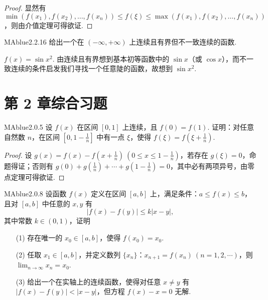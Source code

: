 \begin{proof}
    显然有 $\min\left( f(x_1), f(x_2), \ldots, f(x_n) \right) \leqslant f(\xi) \leqslant \max\left( f(x_1), f(x_2), \ldots, f(x_n) \right)$，则由介值定理可得欲证.
\end{proof}

\begin{problem}{MAblue}{2.2.16}
    给出一个在 $(-\infty, +\infty)$ 上连续且有界但不一致连续的函数.
\end{problem}

\begin{solution}
    $f(x) = \sin x^2$. 由连续且有界想到基本初等函数中的 $\sin x$（或 $\cos x$），而不一致连续的条件启发我们寻找一个任意陡的函数，故想到 $\sin x^2$.
\end{solution}

\section*{第 2 章综合习题}

\begin{problem}{MAblue}{2.0.5}
    设 $f(x)$ 在区间 $[0, 1]$ 上连续，且 $f(0) = f(1)$. 证明：对任意自然数 $n$，在区间 $\left[ 0, 1 - \frac 1 n \right]$ 中有一点 $\xi$，使得 $f(\xi) = f\left( \xi + \frac 1 n \right)$.
\end{problem}

\begin{proof}
    设 $g(x) = f(x) - f(x+\frac 1 n) \ (0 \leqslant x \leqslant 1 - \frac 1 n)$，若存在 $g(\xi) = 0$，命题得证；否则有 $g(0) + g(\frac 1 n) + \cdots + g(1-\frac 1 n) = 0$，其中必有两项异号，由零点定理可得欲证.
\end{proof}

\begin{problem}{MAblue}{2.0.8}
    设函数 $f(x)$ 定义在区间 $[a, b]$ 上，满足条件：$a \leqslant f(x) \leqslant b$，且对 $[a, b]$ 中任意的 $x, y$ 有
    \[
        |f(x) - f(y)| \leqslant k|x - y|,
    \]
    其中常数 $k \in (0, 1)$，证明
    \begin{enumerate}
        \item[(1)]
        存在唯一的 $x_0 \in [a, b]$，使得 $f(x_0) = x_0$.
        \item[(2)]
        任取 $x_1 \in [a, b]$，并定义数列 $\{ x_n \}$：$x_{n+1} = f(x_n) \ (n = 1, 2, \cdots)$，则 $\lim_{n \to \infty} x_n = x_0$.
        \item[(3)]
        给出一个在实轴上的连续函数，使得对任意 $x \neq y$ 有 $|f(x) - f(y)| < |x-y|$，但方程 $f(x) - x = 0$ 无解.
    \end{enumerate}
\end{problem}

